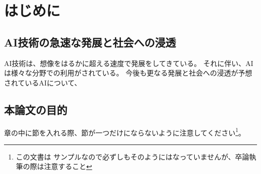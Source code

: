 \chapter{はじめに}

\section{AI技術の急速な発展と社会への浸透}
AI技術は、想像をはるかに超える速度で発展をしてきている。
それに伴い、AIは様々な分野での利用がされている。
今後も更なる発展と社会への浸透が予想されているAIについて、


\section{本論文の目的}
章の中に節を入れる際、節が一つだけにならないように注意してください\footnote{この文書は
サンプルなので必ずしもそのようにはなっていませんが、卒論執筆の際は注意すること}。

